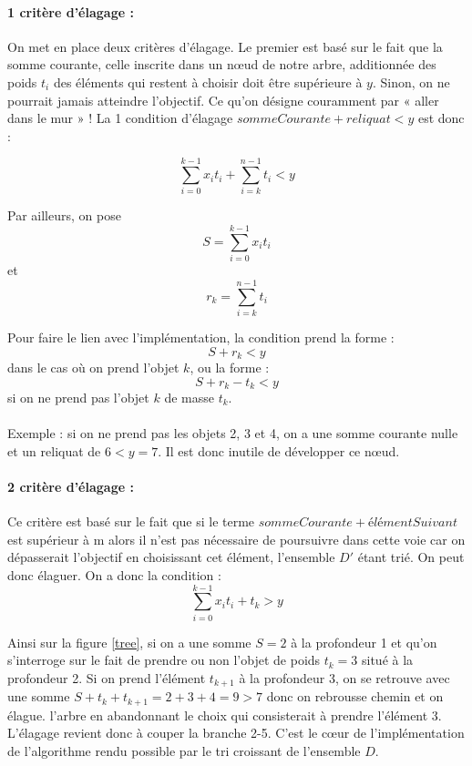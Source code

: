 \paragraph{1\ier{} critère d'élagage :} On met en place deux critères d'élagage. Le premier est basé sur le fait que la somme courante, celle inscrite 
dans un nœud de notre arbre, additionnée des poids $t_i$ des éléments qui restent à choisir doit être supérieure à $y$. 
Sinon, on ne pourrait jamais atteindre l'objectif. Ce qu'on désigne couramment par « aller dans le mur » !
La 1\iere{} condition d'élagage $somme Courante + reliquat < y$ est donc :

\[\sum \limits_{i=0}^{k-1} x_{i}t_{i} + \sum \limits_{i=k}^{n-1} t_{i} < y\]

Par ailleurs, on pose 
\[S = \sum_{i=0}^{k-1} x_{i}t_{i}\] 
et 
\[r_k = \sum_{i=k}^{n-1} t_{i}\]

Pour faire le lien avec l'implémentation, la condition prend la forme : 
\[S + r_k < y\] dans le cas où on prend l'objet $k$, ou la forme :
\[S + r_k -t_k < y\] si on ne prend pas l'objet $k$ de masse $t_k$.

\paragraph{}
Exemple : si on ne prend pas les objets 2, 3 et 4, on a une somme courante nulle et un reliquat de $6 < y = 7$. 
Il est donc inutile de développer ce nœud. 

\paragraph{2 critère d'élagage :} Ce critère est basé sur le fait que si le terme $somme Courante + élémentSuivant$ est supérieur à m 
alors il n'est pas nécessaire de poursuivre dans cette voie car on dépasserait l'objectif en choisissant cet élément, l'ensemble $D'$ étant trié. On peut donc élaguer. On a donc la condition :
\[\sum_{i=0}^{k-1} x_{i}t_{i} + t_{k} > y\]

Ainsi sur la figure \ref{tree}, si on a une somme $S = 2$ à la profondeur 1 et qu'on s'interroge sur le fait de prendre ou non l'objet de poids $t_k = 3$ situé à la profondeur 2. 
Si on prend l'élément $t_{k+1}$ à la profondeur 3, on se retrouve avec une somme $S + t_k + t_{k+1} = 2 + 3 + 4 = 9 > 7$ 
donc on rebrousse chemin et on élague. l'arbre en abandonnant le choix qui consisterait à prendre l'élément 3. L'élagage revient donc à couper la branche 2-5. C'est le cœur de l'implémentation 
de l'algorithme rendu possible par le tri croissant de l'ensemble $D$. 


